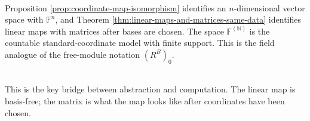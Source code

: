 \begin{perspective} \label{per:finite-support-coordinate-model} \\
Proposition \ref{prop:coordinate-map-isomorphism} identifies an $n$-dimensional vector space with $\mathbb{F}^n$, and Theorem \ref{thm:linear-maps-and-matrices-same-data} identifies linear maps with matrices after bases are chosen. The space $\mathbb{F}^{(\mathbb{N})}$ is the countable standard-coordinate model with finite support. This is the field analogue of the free-module notation $(R^B)_0$.
\end{perspective}

\begin{motivation} \\
This is the key bridge between abstraction and computation. The linear map is basis-free; the matrix is what the map looks like after coordinates have been chosen.
\end{motivation}
